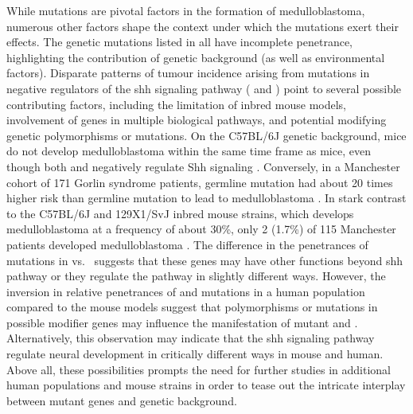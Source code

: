 While mutations are pivotal factors in the formation of medulloblastoma, numerous other factors shape the context under which the mutations exert their effects. The genetic mutations listed in  all have incomplete penetrance, highlighting the contribution of genetic background (as well as environmental factors). Disparate patterns of tumour incidence arising from mutations in negative regulators of the \gls{shh} signaling pathway ( and ) point to several possible contributing factors, including the limitation of inbred mouse models, involvement of genes in multiple biological pathways, and potential modifying genetic polymorphisms or mutations. On the C57BL/6J genetic background, \high{+/-} mice do not develop medulloblastoma within the same time frame as \high{+/-} mice, even though both  and  negatively regulate Shh signaling . Conversely, in a Manchester cohort of 171 Gorlin syndrome patients, germline  mutation had about 20 times higher risk than germline  mutation to lead to medulloblastoma . In stark contrast to the C57BL/6J and 129X1/SvJ inbred mouse strains, which develops medulloblastoma at a frequency of about 30\%, only 2 (1.7\%) of 115 Manchester patients developed medulloblastoma . The difference in the penetrances of mutations in  vs.\  suggests that these genes may have other functions beyond \gls{shh} pathway or they regulate the pathway in slightly different ways. However, the inversion in relative penetrances of  and  mutations in a human population compared to the mouse models suggest that polymorphisms or mutations in possible modifier genes may influence the manifestation of mutant  and . Alternatively, this observation may indicate that the \gls{shh} signaling pathway regulate neural development in critically different ways in mouse and human. Above all, these possibilities prompts the need for further studies in additional human populations and mouse strains in order to tease out the intricate interplay between mutant genes and genetic background. 

